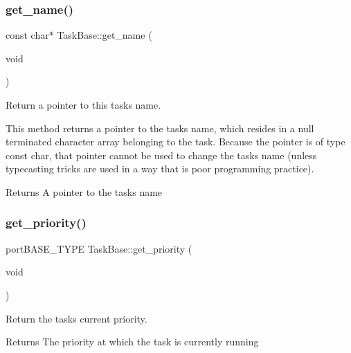 \subsubsection{\texorpdfstring{get\+\_\+name()}{get\_name()}}
{\footnotesize\ttfamily const char$\ast$ Task\+Base\+::get\+\_\+name (\begin{DoxyParamCaption}\item[{void}]{ }\end{DoxyParamCaption})\hspace{0.3cm}{\ttfamily [inline]}}



Return a pointer to this task\textquotesingle{}s name. 

This method returns a pointer to the task\textquotesingle{}s name, which resides in a null terminated character array belonging to the task. Because the pointer is of type {\ttfamily const} {\ttfamily char}, that pointer cannot be used to change the task\textquotesingle{}s name (unless typecasting tricks are used in a way that is poor programming practice). \begin{DoxyReturn}{Returns}
A pointer to the task\textquotesingle{}s name 
\end{DoxyReturn}
\mbox{\label{class_task_base_a1f26fc9564898da36d2355095c204340}} 
\subsubsection{\texorpdfstring{get\+\_\+priority()}{get\_priority()}}
{\footnotesize\ttfamily port\+B\+A\+S\+E\+\_\+\+T\+Y\+PE Task\+Base\+::get\+\_\+priority (\begin{DoxyParamCaption}\item[{void}]{ }\end{DoxyParamCaption})\hspace{0.3cm}{\ttfamily [inline]}}



Return the task\textquotesingle{}s current priority. 

\begin{DoxyReturn}{Returns}
The priority at which the task is currently running 
\end{DoxyReturn}
\mbox{\label{class_task_base_ae4f412b0911d4cf84dad9169a10c46e0}} 
